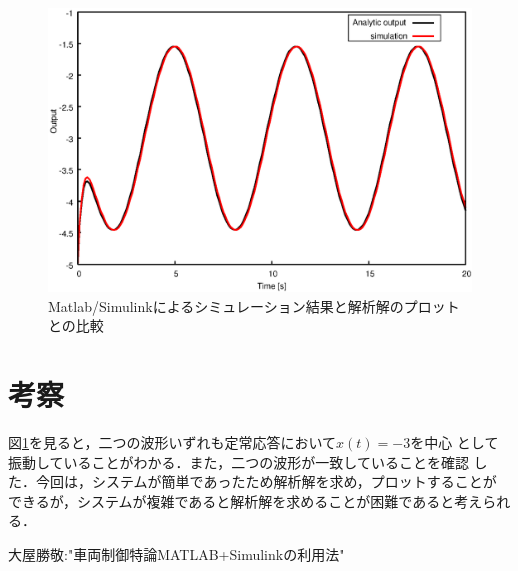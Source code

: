 \documentclass[a4paper,12pt]{jarticle}
\begin{document}
\begin{figure}[hbp]
 \begin{center}
  \includegraphics[width = 150 mm]{fig/text2.eps}
 \end{center}
 \caption{Matlab/Simulinkによるシミュレーション結果と解析解のプロットとの比較}
 \label{fig:text2}
\end{figure}
%
\section{考察}
図\ref{fig:text2}を見ると，二つの波形いずれも定常応答において$x(t)=-3$を中心
として振動していることがわかる．また，二つの波形が一致していることを確認
した．今回は，システムが簡単であったため解析解を求め，プロットすることが
できるが，システムが複雑であると解析解を求めることが困難であると考えられ
る．
%
%
\begin{thebibliography}{99}

  大屋勝敬:"車両制御特論MATLAB+Simulinkの利用法"
\end{thebibliography}
\end{document}
